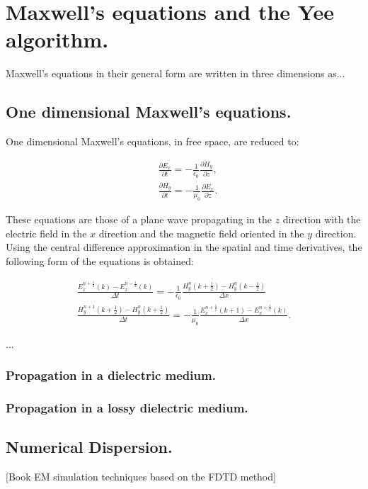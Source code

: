 \documentclass[12pt, oneside]{book}
\begin{document}
\chapter{Maxwell's equations and the Yee algorithm.}

Maxwell's equations in their general form are written in three dimensions as...



\section{One dimensional Maxwell's equations.}
One dimensional Maxwell's equations, in free space, are reduced to:

\begin{align}
& \frac{\partial E_x}{\partial t}=-\frac{1}{\epsilon_0}  \frac{\partial H_y}{\partial z}, \\
& \frac{\partial H_y}{\partial t}=-\frac{1}{\mu_0} \frac{\partial E_x}{\partial z}.
\end{align}

These equations are those of a plane wave propagating in the $z$ direction with the electric field in the $x$ direction and the magnetic field oriented in the $y$ direction. Using the central difference approximation in the spatial and time derivatives, the following form of the equations is obtained:

\begin{align}
 \frac{E_x^{n+\frac{1}{2}}(k)-E_x^{n-\frac{1}{2}}(k)}{\Delta t}=-\frac{1}{\epsilon_0}\frac{H_y^n \left(k+\frac{1}{2}\right) - H_y^n\left(k-\frac{1}{2}\right)}{\Delta x} \\
\frac{H_y^{n+1} \left(k+\frac{1}{2}\right) -H_y^{n}\left( k +\frac{1}{2}\right)}{\Delta t}=-\frac{1}{\mu_0}\frac{E_x^{n+\frac{1}{2}} \left(k+1\right) - E_x^{n+\frac{1}{2}}\left(k\right)}{\Delta x}.
\end{align}

...
\subsection{Propagation in a dielectric medium.}


\subsection{Propagation in a lossy dielectric medium.}


\section{Numerical Dispersion.}
[Book EM simulation techniques based on the FDTD method]
\end{document}
